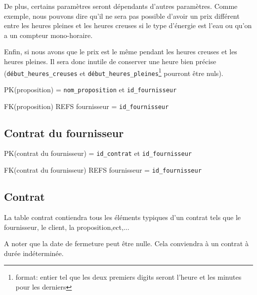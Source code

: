 \begin{flushleft}
De plus, certains paramètres seront dépendants d'autres paramètres. Comme exemple, nous pouvons dire qu'il ne sera pas possible d'avoir  un prix différent entre les heures pleines et les heures creuses si le type d'énergie est l'eau ou qu'on a un compteur mono-horaire.
\end{flushleft}

\begin{flushleft}
Enfin, si nous avons que le prix est le même pendant les heures creuses et les heures pleines. Il sera donc inutile de conserver une heure bien précise (\texttt{début\_heures\_creuses} et \texttt{début\_heures\_pleines}\footnote{format: entier tel que les deux premiers digits seront l'heure et les minutes pour les derniers} pourront être nuls).
\end{flushleft}

\begin{flushleft}
PK(proposition) = \texttt{nom\_proposition} et \texttt{id\_fournisseur}
\end{flushleft}

\begin{flushleft}
FK(proposition) REFS fournisseur = \texttt{id\_fournisseur}
\end{flushleft}
\subsection{Contrat du fournisseur}
\begin{flushleft}
PK(contrat du fournisseur) = \texttt{id\_contrat} et \texttt{id\_fournisseur}
\end{flushleft}

\begin{flushleft}
FK(contrat du fournisseur) REFS fournisseur = \texttt{id\_fournisseur}
\end{flushleft}
\subsection{Contrat}
\begin{flushleft}
La table contrat contiendra tous les éléments typiques d'un contrat tels que le fournisseur, le client, la proposition,ect,...
\end{flushleft}

\begin{flushleft}
A noter que la date de fermeture peut être nulle. Cela conviendra à un contrat à durée indéterminée.
\end{flushleft}


